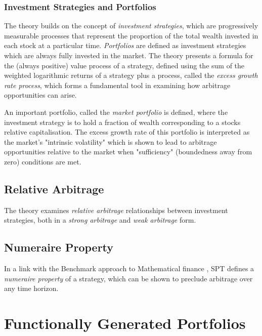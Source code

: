 \documentclass[british]{amsart} \usepackage{lmodern}
\numberwithin{equation}{section} \numberwithin{figure}{section}
\theoremstyle{plain} \newtheorem{thm}{\protect\theoremname}[section]
\theoremstyle{definition} \newtheorem{defn}[thm]{\protect\definitionname}
\theoremstyle{plain} \newtheorem{assumption}[thm]{\protect\assumptionname}
\theoremstyle{plain} \newtheorem{lem}[thm]{\protect\lemmaname}
\theoremstyle{plain} \newtheorem{prop}[thm]{\protect\propositionname}
\theoremstyle{remark} \newtheorem{rem}[thm]{\protect\remarkname}
\theoremstyle{plain} \newtheorem{cor}[thm]{\protect\corollaryname}
\begin{document}
\subsubsection{Investment Strategies and Portfolios}

The theory builds on the concept of \textit{investment strategies}, which are
progressively measurable processes that represent the proportion of the total
wealth invested in each stock at a particular time. \textit{Portfolios} are defined as
investment strategies which are always fully invested in the market. The theory
presents a formula for the (always positive) value process of a strategy,
defined using the sum of the weighted logarithmic returns of a strategy plus a
process, called the \textit{excess growth rate process}, which forms a
fundamental tool in examining how arbitrage opportunities can arise.

An important portfolio, called the \textit{market portfolio} is defined, where the
investment strategy is to hold a fraction of wealth corresponding to a stocks
relative capitalisation. The excess growth rate of this portfolio is interpreted
as the market's "intrinsic volatility" which is shown to lead to arbitrage
opportunities relative to the market when "sufficiency" (boundedness away from
zero) conditions are met.

\subsection{Relative Arbitrage}

The theory examines \textit{relative arbitrage} relationships between investment
strategies, both in a \textit{strong arbitrage} and \textit{weak arbitrage}
form.

\subsection{Numeraire Property}

In a link with the Benchmark approach to Mathematical finance
\cite{platen2006}, SPT defines a \textit{numeraire property} of a strategy,
which can be shown to preclude arbitrage over any time horizon.

\section{Functionally Generated Portfolios}
\end{document}
